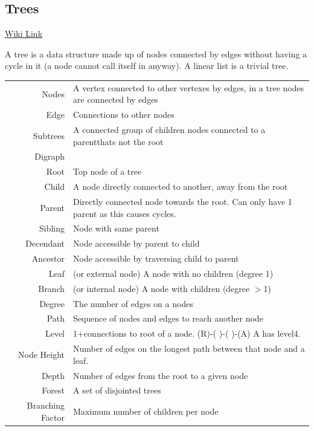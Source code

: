\subsection{Trees}

	\href{https://en.wikipedia.org/wiki/Tree_(data_structure)}{Wiki Link}
	
	A tree is a data structure made up of nodes connected by edges without having a cycle in it (a node cannot call itself in anyway). A linear list is a trivial tree.

\begin{table}
	\begin{tabular}{r p{}}
		Nodes&A vertex connected to other vertexes by edges, in a tree nodes are connected by edges\\
		Edge&Connections to other nodes\\
		Subtrees&A connected group of children nodes connected to a parentthats not the root\\
		Digraph&\\
		Root& Top node of a tree\\
		Child&A node directly connected to another, away from the root\\
		Parent&Directly connected node towards the root. Can only have 1 parent as this causes cycles.\\
		Sibling&Node with same parent\\
		Decendant&Node accessible by parent to child\\
		Ancestor&Node accessible by traversing child to parent\\
		Leaf&(or external node) A node with no children (degree 1)\\
		Branch&(or internal node) A node with children (degree $>$1)\\
		Degree&The number of edges on a nodes\\
		Path&Sequence of nodes and edges to reach another node\\
		Level&1+connections to root of a node. (R)-( )-( )-(A) A has level4.\\
		Node Height&Number of edges on the longest path between that node and a leaf.\\
		Depth&Number of edges from the root to a given node\\
		Forest&A set of disjointed trees\\
		Branching Factor&Maximum number of children per node\\

	\end{tabular}
\end{table}

